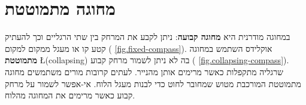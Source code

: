 

\chapter{מחוגה מתמוטטת}\label{c.collapse}


במחוגה מודרנית היא 
\textbf{מחוגה קבועה}:
ניתן לקבע את המרחק בין שתי הרגליים וכך להעתיק קטע קו או מעגל ממקום למקום (%
\ref{fig.fixed-compass}).
אוקלידס השתמש במחוגה 
\textbf{מתמוטטת}
\L{(collapsing)}
בה לא ניתן לשמור מרחק קבוע (%
\ref{fig.collapsing-compass}).
שרגליה מתקפלות כאשר מרימים אותן מהנייר. לעתים קרובות מורים משתמשים מחוגה מתמוטטת המורכבת מטוש שמחובר לחוט כדי לבנות מעגל הלוח. אי-אפשר לשמור על מרחק קבוע כאשר מרימים את המחוגה מהלוח.

